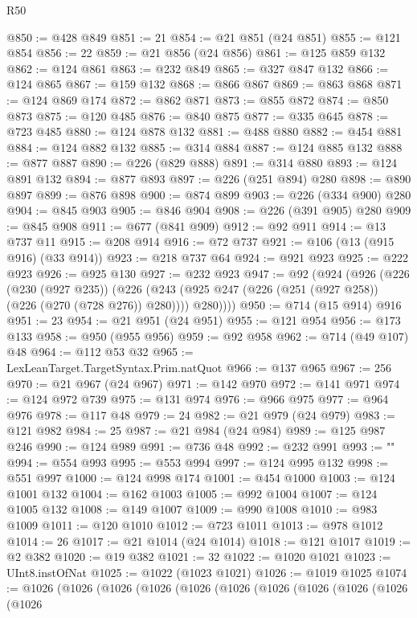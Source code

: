 \begin{lexlean}{R50}
\begin{coremodule}
{{{{{{{{{{{{{{{{{{{{{{{{{{{{{{{{{{{{{{{{{{{{{{{{{{{{{{{{{{{{@850 := @428 @849
@851 := 21
@854 := @21 @851 (@24 @851)
@855 := @121 @854
@856 := 22
@859 := @21 @856 (@24 @856)
@861 := @125 @859 @132
@862 := @124 @861
@863 := @232 @849
@865 := @327 @847 @132
@866 := @124 @865
@867 := @159 @132
@868 := @866 @867
@869 := @863 @868
@871 := @124 @869 @174
@872 := @862 @871
@873 := @855 @872
@874 := @850 @873
@875 := @120 @485
@876 := @840 @875
@877 := @335 @645
@878 := @723 @485
@880 := @124 @878 @132
@881 := @488 @880
@882 := @454 @881
@884 := @124 @882 @132
@885 := @314 @884
@887 := @124 @885 @132
@888 := @877 @887
@890 := @226 (@829 @888)
@891 := @314 @880
@893 := @124 @891 @132
@894 := @877 @893
@897 := @226 (@251 @894) @280
@898 := @890 @897
@899 := @876 @898
@900 := @874 @899
@903 := @226 (@334 @900) @280
@904 := @845 @903
@905 := @846 @904
@908 := @226 (@391 @905) @280
@909 := @845 @908
@911 := @677 (@841 @909)
@912 := @92 @911
@914 := @13 @737 @11
@915 := @208 @914
@916 := @72 @737
@921 := @106 (@13 (@915 @916) (@33 @914))
@923 := @218 @737 @64
@924 := @921 @923
@925 := @222 @923
@926 := @925 @130
@927 := @232 @923
@947 := @92
    (@924
      (@926
        (@226
          (@230 (@927 @235))
          (@226 (@243 (@925 @247 (@226 (@251 (@927 @258)) (@226 (@270 (@728 @276)) @280)))) @280))))
@950 := @714 (@15 @914) @916
@951 := 23
@954 := @21 @951 (@24 @951)
@955 := @121 @954
@956 := @173 @133
@958 := @950 (@955 @956)
@959 := @92 @958
@962 := @714 (@49 @107) @48
@964 := @112 @53 @32
@965 := LexLeanTarget.TargetSyntax.Prim.natQuot
@966 := @137 @965
@967 := 256
@970 := @21 @967 (@24 @967)
@971 := @142 @970
@972 := @141 @971
@974 := @124 @972 @739
@975 := @131 @974
@976 := @966 @975
@977 := @964 @976
@978 := @117 @48
@979 := 24
@982 := @21 @979 (@24 @979)
@983 := @121 @982
@984 := 25
@987 := @21 @984 (@24 @984)
@989 := @125 @987 @246
@990 := @124 @989
@991 := @736 @48
@992 := @232 @991
@993 := "\n"
@994 := @554 @993
@995 := @553 @994
@997 := @124 @995 @132
@998 := @551 @997
@1000 := @124 @998 @174
@1001 := @454 @1000
@1003 := @124 @1001 @132
@1004 := @162 @1003
@1005 := @992 @1004
@1007 := @124 @1005 @132
@1008 := @149 @1007
@1009 := @990 @1008
@1010 := @983 @1009
@1011 := @120 @1010
@1012 := @723 @1011
@1013 := @978 @1012
@1014 := 26
@1017 := @21 @1014 (@24 @1014)
@1018 := @121 @1017
@1019 := @2 @382
@1020 := @19 @382
@1021 := 32
@1022 := @1020 @1021
@1023 := UInt8.instOfNat
@1025 := @1022 (@1023 @1021)
@1026 := @1019 @1025
@1074 := @1026
    (@1026
      (@1026
        (@1026
          (@1026
            (@1026
              (@1026
                (@1026
                  (@1026
                    (@1026
                      (@1026
}}}}}}}}}}}}}}}}}}}}}}}}}}}}}}}}}}}}}}}}}}}}}}}}}}}}}}}}}}}}
\end{coremodule}
\end{lexlean}
